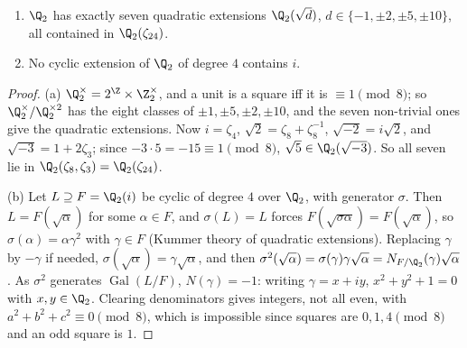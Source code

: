 \begin{proposition}[$p=2$]\label{prop:Q2}
\begin{enumerate}[label=(\alph*)]
\item $\Q_2$ has exactly seven quadratic extensions $\Q_2(\sqrt d)$, $d\in\{-1,\pm2,\pm5,\pm10\}$, all contained in $\Q_2(\zeta_{24})$.
\item No cyclic extension of $\Q_2$ of degree $4$ contains $i$.
\end{enumerate}
\end{proposition}
\begin{proof}
(a) $\Q_2^\times=2^\Z\times\Z_2^\times$, and a unit is a square iff it is $\equiv1\pmod8$; so $\Q_2^\times/\Q_2^{\times2}$ has the eight classes of
$\pm1,\pm5,\pm2,\pm10$, and the seven non-trivial ones give the quadratic extensions. Now $i=\zeta_4$, $\sqrt2=\zeta_8+\zeta_8^{-1}$,
$\sqrt{-2}=i\sqrt2$, and $\sqrt{-3}=1+2\zeta_3$; since $-3\cdot5=-15\equiv1\pmod8$, $\sqrt5\in\Q_2(\sqrt{-3})$. So all seven lie in
$\Q_2(\zeta_8,\zeta_3)=\Q_2(\zeta_{24})$.

(b) Let $L\supseteq F=\Q_2(i)$ be cyclic of degree $4$ over $\Q_2$, with generator $\sigma$. Then $L=F(\sqrt\alpha)$ for some $\alpha\in F$, and
$\sigma(L)=L$ forces $F(\sqrt{\sigma\alpha})=F(\sqrt\alpha)$, so $\sigma(\alpha)=\alpha\gamma^2$ with $\gamma\in F$ (Kummer theory of quadratic
extensions). Replacing $\gamma$ by $-\gamma$ if needed, $\sigma(\sqrt\alpha)=\gamma\sqrt\alpha$, and then
$\sigma^2(\sqrt\alpha)=\sigma(\gamma)\gamma\sqrt\alpha=N_{F/\Q_2}(\gamma)\sqrt\alpha$. As $\sigma^2$ generates $\operatorname{Gal}(L/F)$, $N(\gamma)=-1$: writing
$\gamma=x+iy$, $x^2+y^2+1=0$ with $x,y\in\Q_2$. Clearing denominators gives integers, not all even, with $a^2+b^2+c^2\equiv0\pmod 8$, which is
impossible since squares are $0,1,4\pmod8$ and an odd square is $1$.
\end{proof}


